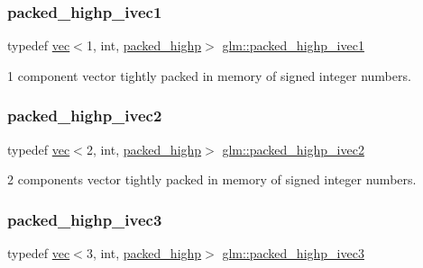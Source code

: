 \subsubsection{\texorpdfstring{packed\+\_\+highp\+\_\+ivec1}{packed\_highp\_ivec1}}
{\footnotesize\ttfamily typedef \hyperlink{structglm_1_1vec}{vec}$<$1, int, \hyperlink{namespaceglm_a36ed105b07c7746804d7fdc7cc90ff25a8e8791ee77fe079b1291f710d88031bf}{packed\+\_\+highp}$>$ \hyperlink{group__gtc__type__aligned_ga7fde67656fb5726169114054992f0a3f}{glm\+::packed\+\_\+highp\+\_\+ivec1}}



1 component vector tightly packed in memory of signed integer numbers. 

\mbox{\label{group__gtc__type__aligned_gae362d70a8be88cc43b6c1ec0992e73db}} 
\subsubsection{\texorpdfstring{packed\+\_\+highp\+\_\+ivec2}{packed\_highp\_ivec2}}
{\footnotesize\ttfamily typedef \hyperlink{structglm_1_1vec}{vec}$<$2, int, \hyperlink{namespaceglm_a36ed105b07c7746804d7fdc7cc90ff25a8e8791ee77fe079b1291f710d88031bf}{packed\+\_\+highp}$>$ \hyperlink{group__gtc__type__aligned_gae362d70a8be88cc43b6c1ec0992e73db}{glm\+::packed\+\_\+highp\+\_\+ivec2}}



2 components vector tightly packed in memory of signed integer numbers. 

\mbox{\label{group__gtc__type__aligned_ga56b9f0123506edc416bbcf957d3ce678}} 
\subsubsection{\texorpdfstring{packed\+\_\+highp\+\_\+ivec3}{packed\_highp\_ivec3}}
{\footnotesize\ttfamily typedef \hyperlink{structglm_1_1vec}{vec}$<$3, int, \hyperlink{namespaceglm_a36ed105b07c7746804d7fdc7cc90ff25a8e8791ee77fe079b1291f710d88031bf}{packed\+\_\+highp}$>$ \hyperlink{group__gtc__type__aligned_ga56b9f0123506edc416bbcf957d3ce678}{glm\+::packed\+\_\+highp\+\_\+ivec3}}



